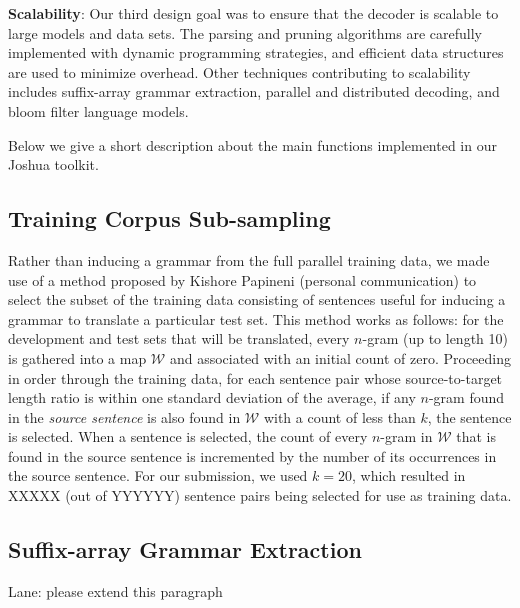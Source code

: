 \documentclass[11pt]{article}
\newcommand{\ignore}[1]{}
\begin{document}
\textbf{Scalability}: Our third design goal was to ensure that the decoder is scalable to large models and data sets. The parsing and pruning algorithms are carefully implemented with dynamic programming strategies, and efficient data structures are used to minimize overhead. Other techniques contributing to scalability includes suffix-array grammar extraction, parallel and distributed decoding, and bloom filter language models.

Below we give a short description about the main functions implemented in our Joshua toolkit.

\subsection{Training Corpus Sub-sampling}

Rather than inducing a grammar from the full parallel training data, we made use of a method proposed by Kishore Papineni (personal communication) to select the subset of the training data consisting of  sentences useful for inducing a grammar to translate a particular test set.  This method works as follows: for the development and test sets that will be translated, every $n$-gram (up to length 10) is gathered into a map $\mathcal{W}$ and associated with an initial count of zero.  Proceeding in order through the training data, for each sentence pair whose source-to-target length ratio is within one standard deviation of the average, if any $n$-gram found in the \emph{source sentence} is also found in $\mathcal{W}$ with a count of less than $k$, the sentence is selected.  When a sentence is selected, the count of every $n$-gram in $\mathcal{W}$ that is found in the source sentence is incremented by the number of its occurrences in the source sentence. \ignore{Thus, there are two conditions in which a sentence will not be selected: 1) it only contains $n$-grams that are not found in $\mathcal{W}$ (making it useless for learning in the highly lexicalized models we use) or 2) it only contains $n$-grams that have already been attested in the selected set $k$ or more times.} For our submission, we used $k=20$, which resulted in XXXXX (out of YYYYYY) sentence pairs being selected for use as training data.

\subsection{Suffix-array Grammar Extraction}
Lane: please extend this paragraph
\end{document}
